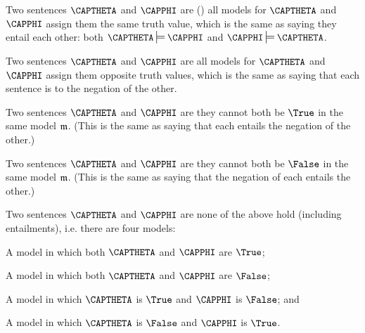 \begin{majorILnc}{}
Two sentences $\CAPTHETA$ and $\CAPPHI$ are   () \Iff all models for $\CAPTHETA$ and $\CAPPHI$ assign them the same truth value, which is the same as saying they entail each other: both $\CAPTHETA\sdtstile{}{}\CAPPHI$ and $\CAPPHI\sdtstile{}{}\CAPTHETA$.
\end{majorILnc}
\begin{majorILnc}{}
Two sentences $\CAPTHETA$ and $\CAPPHI$ are  \Iff all models for $\CAPTHETA$ and $\CAPPHI$ assign them opposite truth values, which is the same as saying that each sentence is  to the negation of the other.
\end{majorILnc}
\begin{majorILnc}{}
Two sentences $\CAPTHETA$ and $\CAPPHI$ are  \Iff they cannot both be $\True$ in the same model $\mathfrak{m}$. (This is the same as saying that each entails the negation of the other.)
\end{majorILnc}
\begin{majorILnc}{}
Two sentences $\CAPTHETA$ and $\CAPPHI$ are  \Iff they cannot both be $\False$ in the same model $\mathfrak{m}$. (This is the same as saying that the negation of each entails the other.)
\end{majorILnc}
\begin{majorILnc}{}
Two sentences $\CAPTHETA$ and $\CAPPHI$ are  \Iff none of the above hold (including entailments), i.e. \Iff there are four models:
\begin{cenumerate}
\item A model in which both $\CAPTHETA$ and $\CAPPHI$ are $\True$; 
\item A model in which both $\CAPTHETA$ and $\CAPPHI$ are $\False$;
\item A model in which $\CAPTHETA$ is $\True$ and $\CAPPHI$ is $\False$; and
\item A model in which $\CAPTHETA$ is $\False$ and $\CAPPHI$ is $\True$.
\end{cenumerate}
\end{majorILnc}
